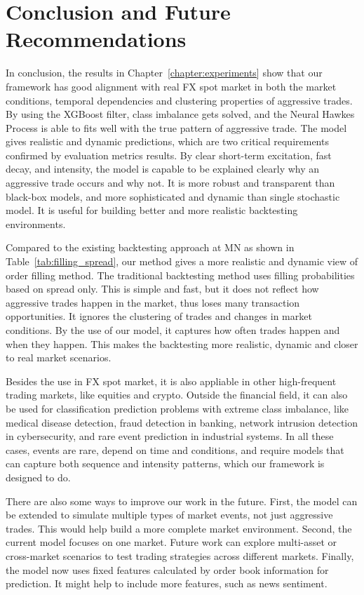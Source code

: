 \chapter{Conclusion and Future Recommendations}\label{chapter:cd}
In conclusion, the results in Chapter~\ref{chapter:experiments} show that our framework has good alignment with real FX spot market in both the market conditions, temporal dependencies and clustering properties of aggressive trades. By using the XGBoost filter, class imbalance gets solved, and the Neural Hawkes Process is able to fits well with the true pattern of aggressive trade. The model gives realistic and dynamic predictions, which are two critical requirements confirmed by evaluation metrics results. By clear short-term excitation, fast decay, and intensity, the model is capable to be explained clearly why an aggressive trade occurs and why not. It is more robust and transparent than black-box models, and more sophisticated and dynamic than single stochastic model. It is useful for building better and more realistic backtesting environments.

Compared to the existing backtesting approach at MN as shown in Table~\ref{tab:filling_spread}, our method gives a more realistic and dynamic view of order filling method. The traditional backtesting method uses filling probabilities based on spread only. This is simple and fast, but it does not reflect how aggressive trades happen in the market, thus loses many transaction opportunities. It ignores the clustering of trades and changes in market conditions. By the use of our model, it captures how often trades happen and when they happen. This makes the backtesting more realistic, dynamic and closer to real market scenarios. 

Besides the use in FX spot market, it is also appliable in other high-frequent trading markets, like equities and crypto. Outside the financial field, it can also be used for classification prediction problems with extreme class imbalance, like medical disease detection, fraud detection in banking, network intrusion detection in cybersecurity, and rare event prediction in industrial systems. In all these cases, events are rare, depend on time and conditions, and require models that can capture both sequence and intensity patterns, which our framework is designed to do.

There are also some ways to improve our work in the future. First, the model can be extended to simulate multiple types of market events, not just aggressive trades. This would help build a more complete market environment. Second, the current model focuses on one market. Future work can explore multi-asset or cross-market scenarios to test trading strategies across different markets. Finally, the model now uses fixed features calculated by order book information for prediction. It might help to include more features, such as news sentiment. 